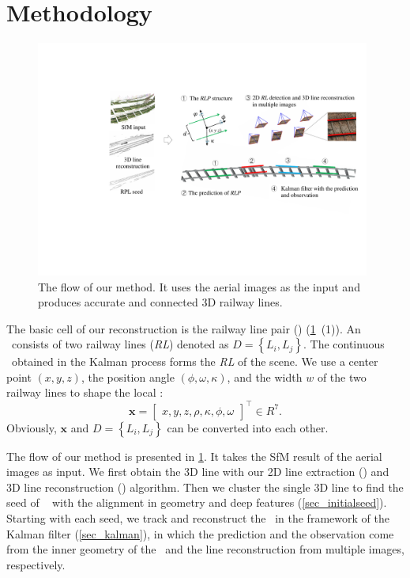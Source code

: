 \section{Methodology}
\begin{figure}
    \centering
    \includegraphics[width=0.98\textwidth]{images/overview.pdf}
    \caption{The flow of our method.
    It uses the aerial images as the input and produces accurate
    and connected 3D railway lines.}
    \label{fig_overview}
\end{figure}


The basic cell of our reconstruction is the railway line pair (\rlp) (\cref{fig_overview}~(1)).
An \rlp~consists of two railway lines (\textit{RL}) denoted as $D=\left\{L_i,L_j\right\}$.
The continuous \rlp~obtained in the Kalman process forms the \textit{RL} of the scene.
We use a center point $\left(x,y,z\right)$,
the position angle $\left(\phi,\omega,\kappa\right)$,
and the width $w$ of the two railway lines to shape the local \rlp:
\begin{equation}
\mathbf x = \begin{bmatrix}
    x,y,z,\rho,\kappa,\phi,\omega
\end{bmatrix}^ \top \in R^{7}.
\label{eq_prediction3} 
\end{equation}
Obviously,
$\mathbf x $ and $D=\left\{L_i,L_j\right\}$ can be converted into each other.

The flow of our method is presented in \cref{fig_overview}. 
It takes the SfM result of the aerial images as input.
We first obtain the 3D line with our 2D line extraction (\cite{ag3line}) and 3D line reconstruction (\cite{WEI2024}) algorithm.
Then
we cluster the single 3D line to find the seed of \rlp~ with the alignment in geometry and deep features (\cref{sec_initialseed}).
Starting with each seed,
we track and reconstruct the \rlp~in the framework of the Kalman filter (\cref{sec_kalman}),
in which the prediction and the observation come from the inner geometry of the \rlp~and the line reconstruction from multiple images,
respectively.


